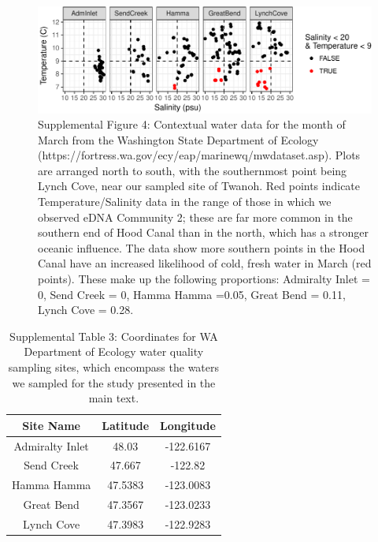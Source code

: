 \documentclass[fleqn,10pt,lineno]{wlpeerj} %
\begin{document}
\begin{figure}[!ht]

{\centering \includegraphics{20171117_Tides_and_eDNA_RPK_files/figure-latex/ContextualWaterData_WAEcology-1} 

}

\caption*{\label{fig:SupplementalWaterChem}Supplemental Figure 4: Contextual water data for the month of March from the Washington State Department of Ecology (https://fortress.wa.gov/ecy/eap/marinewq/mwdataset.asp). Plots are arranged north to south, with the southernmost point being Lynch Cove, near our sampled site of Twanoh. Red points indicate Temperature/Salinity data in the range of those in which we observed eDNA Community 2; these are far more common in the southern end of Hood Canal than in the north, which has a stronger oceanic influence. The data show more southern points in the Hood Canal have an increased likelihood of cold, fresh water in March (red points). These make up the following proportions: Admiralty Inlet = 0, Send Creek = 0, Hamma Hamma =0.05, Great Bend = 0.11, Lynch Cove = 0.28.}\label{fig:ContextualWaterData_WAEcology}
\end{figure}

\begin{table}[!ht]

\caption*{\label{tab:SupplTable_EcologySampling}Supplemental Table 3: Coordinates for WA Department of Ecology water quality sampling sites, which encompass the waters we sampled for the study presented in the main text.}
\centering
\begin{tabular}[t]{c|c|c}
\hline
Site Name & Latitude & Longitude\\
\hline
Admiralty Inlet & 48.03 & -122.6167\\
\hline
Send Creek & 47.667 & -122.82\\
\hline
Hamma Hamma & 47.5383 & -123.0083\\
\hline
Great Bend & 47.3567 & -123.0233\\
\hline
Lynch Cove & 47.3983 & -122.9283\\
\hline
\end{tabular}
\end{table}
\end{document}

